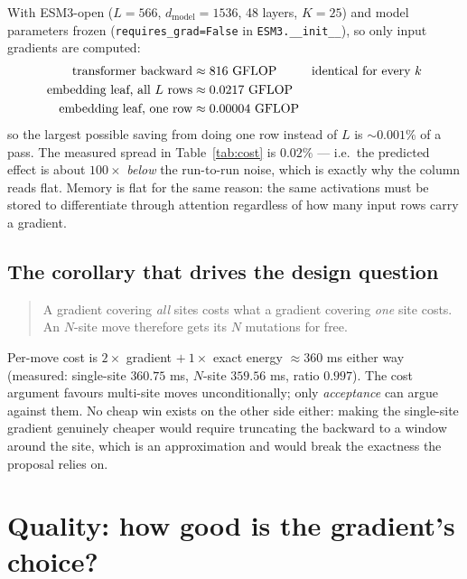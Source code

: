 \documentclass[11pt,a4paper]{article}
\begin{document}
With ESM3-open ($L=566$, $d_{\mathrm{model}}=1536$, 48 layers, $K=25$) and
model parameters frozen (\texttt{requires\_grad=False} in \texttt{ESM3.\_\_init\_\_}),
so only input gradients are computed:
\begin{align}
  \text{transformer backward} &\approx 816\ \text{GFLOP}
     &&\text{identical for every } k \notag\\
  \text{embedding leaf, all } L \text{ rows} &\approx 0.0217\ \text{GFLOP} \notag\\
  \text{embedding leaf, one row} &\approx 0.00004\ \text{GFLOP} \notag
\end{align}
so the largest possible saving from doing one row instead of $L$ is
$\sim\!0.001\%$ of a pass. The measured spread in
Table~\ref{tab:cost} is $0.02\%$ --- i.e.\ the predicted effect is about
$100\times$ \emph{below} the run-to-run noise, which is exactly why the column
reads flat. Memory is flat for the same reason: the same activations must be
stored to differentiate through attention regardless of how many input rows
carry a gradient.

\subsection{The corollary that drives the design question}

\begin{quote}
A gradient covering \emph{all} sites costs what a gradient covering
\emph{one} site costs. An $N$-site move therefore gets its $N$ mutations for
free.
\end{quote}
Per-move cost is $2\times$ gradient $+\ 1\times$ exact energy $\approx 360$ ms
either way (measured: single-site $360.75$ ms, $N$-site $359.56$ ms, ratio
$0.997$). The cost argument favours multi-site moves unconditionally; only
\emph{acceptance} can argue against them. No cheap win exists on the other
side either: making the single-site gradient genuinely cheaper would require
truncating the backward to a window around the site, which is an
approximation and would break the exactness the proposal relies on.

\section{Quality: how good is the gradient's choice?}
\label{sec:quality}
\end{document}
